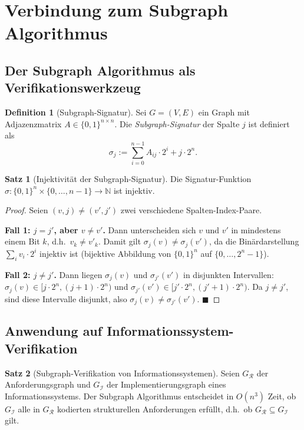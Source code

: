 ﻿\documentclass[a4paper,12pt]{article}
\theoremstyle{definition}
\newtheorem{definition}{Definition}
\newtheorem{satz}{Satz}
\begin{document}
\section{Verbindung zum Subgraph Algorithmus}
\label{sec:subgraph}

\subsection{Der Subgraph Algorithmus als Verifikationswerkzeug}

\begin{definition}[Subgraph-Signatur]
\label{def:sigsub}
Sei $G = (V, E)$ ein Graph mit Adjazenzmatrix $A \in \{0,1\}^{n \times n}$.
Die \emph{Subgraph-Signatur} der Spalte $j$ ist definiert als
\[
  \sigma_j := \sum_{i=0}^{n-1} A_{ij} \cdot 2^i + j \cdot 2^n.
\]
\end{definition}

\begin{satz}[Injektivität der Subgraph-Signatur]
\label{satz:injektiv}
Die Signatur-Funktion $\sigma: \{0,1\}^n \times \{0,\ldots,n-1\} \to \mathbb{N}$
ist injektiv.
\end{satz}

\begin{proof}
Seien $(v, j) \neq (v', j')$ zwei verschiedene Spalten-Index-Paare.

\textbf{Fall 1: $j = j'$, aber $v \neq v'$.}
Dann unterscheiden sich $v$ und $v'$ in mindestens einem Bit $k$, d.h.\ $v_k \neq v'_k$.
Damit gilt $\sigma_j(v) \neq \sigma_j(v')$, da die Binärdarstellung $\sum_i v_i \cdot 2^i$
injektiv ist (bijektive Abbildung von $\{0,1\}^n$ auf $\{0,\ldots,2^n-1\}$).

\textbf{Fall 2: $j \neq j'$.}
Dann liegen $\sigma_j(v)$ und $\sigma_{j'}(v')$ in disjunkten Intervallen:
$\sigma_j(v) \in [j \cdot 2^n, (j+1) \cdot 2^n)$ und
$\sigma_{j'}(v') \in [j' \cdot 2^n, (j'+1) \cdot 2^n)$.
Da $j \neq j'$, sind diese Intervalle disjunkt, also $\sigma_j(v) \neq \sigma_{j'}(v')$. $\blacksquare$
\end{proof}

\subsection{Anwendung auf Informationssystem-Verifikation}

\begin{satz}[Subgraph-Verifikation von Informationssystemen]
\label{satz:subgraphverif}
Seien $G_\mathcal{R}$ der Anforderungsgraph und $G_\mathcal{I}$ der Implementierungsgraph
eines Informationssystems. Der Subgraph Algorithmus entscheidet in $O(n^3)$ Zeit, ob
$G_\mathcal{I}$ alle in $G_\mathcal{R}$ kodierten strukturellen Anforderungen erfüllt,
d.h.\ ob $G_\mathcal{R} \subseteq G_\mathcal{I}$ gilt.
\end{satz}
\end{document}
